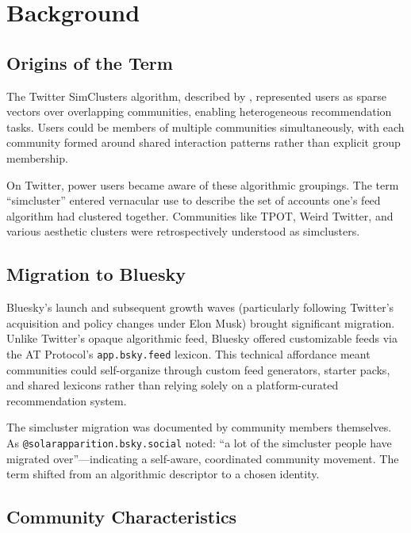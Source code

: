 \documentclass[11pt,a4paper]{article}
\begin{document}
\section{Background}

\subsection{Origins of the Term}

The Twitter SimClusters algorithm, described by \citet{simclusters-kdd2020}, represented users as sparse vectors over overlapping communities, enabling heterogeneous recommendation tasks. Users could be members of multiple communities simultaneously, with each community formed around shared interaction patterns rather than explicit group membership.

On Twitter, power users became aware of these algorithmic groupings. The term ``simcluster'' entered vernacular use to describe the set of accounts one's feed algorithm had clustered together. Communities like TPOT, Weird Twitter, and various aesthetic clusters were retrospectively understood as simclusters.

\subsection{Migration to Bluesky}

Bluesky's launch and subsequent growth waves (particularly following Twitter's acquisition and policy changes under Elon Musk) brought significant migration. Unlike Twitter's opaque algorithmic feed, Bluesky offered customizable feeds via the AT Protocol's \texttt{app.bsky.feed} lexicon. This technical affordance meant communities could self-organize through custom feed generators, starter packs, and shared lexicons rather than relying solely on a platform-curated recommendation system.

The simcluster migration was documented by community members themselves. As \texttt{@solarapparition.bsky.social} noted: ``a lot of the simcluster people have migrated over''---indicating a self-aware, coordinated community movement. The term shifted from an algorithmic descriptor to a chosen identity.

\subsection{Community Characteristics}
\end{document}
